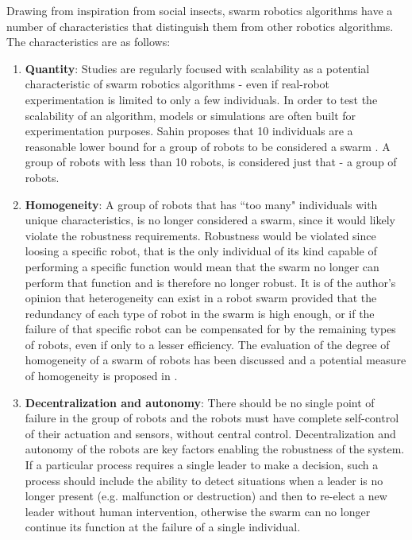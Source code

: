 Drawing from inspiration from social insects, swarm robotics algorithms have a number of characteristics that distinguish them from other robotics algorithms. The characteristics are as follows:

\begin{enumerate}

\item \textbf{Quantity}: Studies are regularly focused with scalability as a potential characteristic of swarm robotics algorithms - even if real-robot experimentation is limited to only a few individuals. In order to test the scalability of an algorithm, models or simulations are often built for experimentation purposes. Sahin proposes that 10 individuals are a reasonable lower bound for a group of robots to be considered a swarm \cite{csahin2005swarm}. A group of robots with less than 10 robots, is considered just that - a group of robots. 

\item \textbf{Homogeneity}: A group of robots that has ``too many" individuals with unique characteristics, is no longer considered a swarm, since it would likely violate the robustness requirements. Robustness would be violated since loosing a specific robot, that is the only individual of its kind capable of performing a specific function would mean that the swarm no longer can perform that function and is therefore no longer robust. It is of the author's opinion that heterogeneity can exist in a robot swarm provided that the redundancy of each type of robot in the swarm is high enough, or if the failure of that specific robot can be compensated for by the remaining types of robots, even if only to a lesser efficiency. The evaluation of the degree of homogeneity of a swarm of robots has been discussed and a potential measure of homogeneity is proposed in \cite{balch2000hierarchic}.

\item \textbf{Decentralization and autonomy}: There should be no single point of failure in the group of robots and the robots must have complete self-control of their actuation and sensors, without central control. Decentralization and autonomy of the robots are key factors enabling the robustness of the system. If a particular process requires a single leader to make a decision, such a process should include the ability to detect situations when a leader is no longer present (e.g. malfunction or destruction) and then to re-elect a new leader without human intervention, otherwise the swarm can no longer continue its function at the failure of a single individual.


\end{enumerate}
